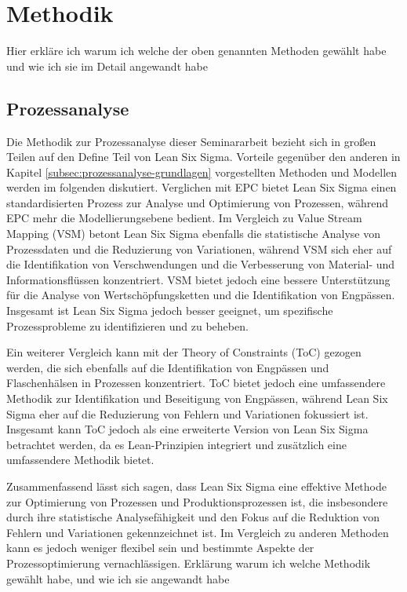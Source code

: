 \documentclass[11pt,a4paper]{scrartcl}
\begin{document}
\section{Methodik}\label{sec:methodik}
Hier erkläre ich warum ich welche der oben genannten Methoden gewählt habe und wie ich sie im Detail angewandt habe
\subsection{Prozessanalyse}\label{subsec:prozessanalyse-methodik}
Die Methodik zur Prozessanalyse dieser Seminararbeit bezieht sich in großen Teilen auf den Define Teil von Lean Six Sigma.
Vorteile gegenüber den anderen in Kapitel \ref{subsec:prozessanalyse-grundlagen} vorgestellten Methoden und Modellen werden im folgenden diskutiert.
Verglichen mit EPC bietet Lean Six Sigma einen standardisierten Prozess zur Analyse und Optimierung von Prozessen, während EPC mehr die Modellierungsebene bedient.
Im Vergleich zu Value Stream Mapping (VSM) betont Lean Six Sigma ebenfalls die statistische Analyse von Prozessdaten und die Reduzierung von Variationen, während VSM sich eher auf die Identifikation von Verschwendungen und die Verbesserung von Material- und Informationsflüssen konzentriert. VSM bietet jedoch eine bessere Unterstützung für die Analyse von Wertschöpfungsketten und die Identifikation von Engpässen. Insgesamt ist Lean Six Sigma jedoch besser geeignet, um spezifische Prozessprobleme zu identifizieren und zu beheben.

Ein weiterer Vergleich kann mit der Theory of Constraints (ToC) gezogen werden, die sich ebenfalls auf die Identifikation von Engpässen und Flaschenhälsen in Prozessen konzentriert. ToC bietet jedoch eine umfassendere Methodik zur Identifikation und Beseitigung von Engpässen, während Lean Six Sigma eher auf die Reduzierung von Fehlern und Variationen fokussiert ist. Insgesamt kann ToC jedoch als eine erweiterte Version von Lean Six Sigma betrachtet werden, da es Lean-Prinzipien integriert und zusätzlich eine umfassendere Methodik bietet.

Zusammenfassend lässt sich sagen, dass Lean Six Sigma eine effektive Methode zur Optimierung von Prozessen und Produktionsprozessen ist, die insbesondere durch ihre statistische Analysefähigkeit und den Fokus auf die Reduktion von Fehlern und Variationen gekennzeichnet ist. Im Vergleich zu anderen Methoden kann es jedoch weniger flexibel sein und bestimmte Aspekte der Prozessoptimierung vernachlässigen.
Erklärung warum ich welche Methodik gewählt habe, und wie ich sie angewandt habe
\end{document}
